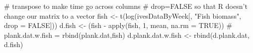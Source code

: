 \begin{Schunk}
\begin{Sinput}
 # transpose to make time go across columns
 # drop=FALSE so that R doesn't change our matrix to a vector
 fish <- t(log(ivesDataByWeek[, "Fish biomass", drop = FALSE]))
 d.fish <- (fish - apply(fish, 1, mean, na.rm = TRUE))
 # plank.dat.w.fish = rbind(plank.dat,fish)
 d.plank.dat.w.fish <- rbind(d.plank.dat, d.fish)
\end{Sinput}
\end{Schunk}
